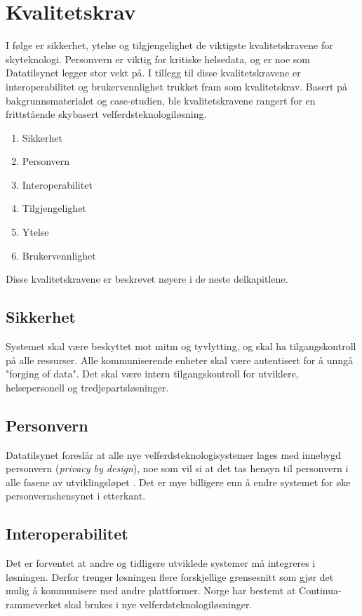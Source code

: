 
\section{Kvalitetskrav}

I følge \citet{softarch} er sikkerhet, ytelse og tilgjengelighet de viktigste kvalitetskravene for skyteknologi.
Personvern er viktig for kritiske helsedata, og er noe som Datatilsynet legger stor vekt på. I tillegg til disse kvalitetskravene
er interoperabilitet og brukervennlighet trukket fram som kvalitetskrav. Basert på bakgrunnsmaterialet og case-studien,
ble kvalitetskravene rangert for en frittstående skybasert velferdsteknologiløsning.

\begin{enumerate}
    \item Sikkerhet
    \item Personvern
    \item Interoperabilitet
    \item Tilgjengelighet
    \item Ytelse
    \item Brukervennlighet
\end{enumerate}

Disse kvalitetskravene er beskrevet nøyere i de neste delkapitlene.

\subsection{Sikkerhet}
Systemet skal være beskyttet mot \gls{mitm} og tyvlytting, og skal ha tilgangskontroll på alle ressurser.
Alle kommuniserende enheter skal være autentisert for å unngå "forging of data". %
Det skal være intern tilgangskontroll for utviklere, helsepersonell og tredjepartsløsninger.

\subsection{Personvern}
Datatilsynet foreslår at alle nye velferdsteknologisystemer lages med innebygd personvern (\textit{privacy by design}),
noe som vil si at det tas hensyn til personvern i alle fasene av utviklingsløpet \citep{datatilsynet_privacy}. Det er mye billigere
enn å endre systemet for øke personvernshensynet i etterkant.

\subsection{Interoperabilitet}
Det er forventet at andre og tidligere utviklede systemer må integreres i løsningen. Derfor trenger løsningen flere forskjellige
grensesnitt som gjør det mulig å kommunisere med andre plattformer. Norge har bestemt at Continua-rammeverket skal brukes i nye
velferdsteknologiløsninger.

